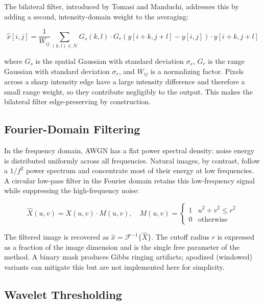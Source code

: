 \documentclass[conference]{IEEEtran}
\begin{document}
The bilateral filter, introduced by Tomasi and Manduchi, addresses this by adding a second, intensity-domain weight to the averaging:

\begin{equation}
  \hat{x}[i,j] = \frac{1}{W_{ij}} \sum_{(k,l) \in \mathcal{N}}
    G_s(k,l) \cdot G_r\!\left(y[i+k,j+l] - y[i,j]\right) \cdot y[i+k,j+l]
  \label{eq:bilateral}
\end{equation}

where $G_s$ is the spatial Gaussian with standard deviation $\sigma_s$, $G_r$ is the range Gaussian with standard deviation $\sigma_r$, and $W_{ij}$ is a normalizing factor. Pixels across a sharp intensity edge have a large intensity difference and therefore a small range weight, so they contribute negligibly to the output. This makes the bilateral filter edge-preserving by construction.

\subsection{Fourier-Domain Filtering}

In the frequency domain, AWGN has a flat power spectral density: noise energy is distributed uniformly across all frequencies. Natural images, by contrast, follow a $1/f^2$ power spectrum and concentrate most of their energy at low frequencies. A circular low-pass filter in the Fourier domain retains this low-frequency signal while suppressing the high-frequency noise:

\begin{equation}
  \hat{X}(u,v) = X(u,v) \cdot M(u,v), \quad
  M(u,v) = \begin{cases} 1 & u^2 + v^2 \leq r^2 \\ 0 & \text{otherwise} \end{cases}
  \label{eq:fourier_lpf}
\end{equation}

The filtered image is recovered as $\hat{x} = \mathcal{F}^{-1}\{\hat{X}\}$. The cutoff radius $r$ is expressed as a fraction of the image dimension and is the single free parameter of the method. A binary mask produces Gibbs ringing artifacts; apodized (windowed) variants can mitigate this but are not implemented here for simplicity.

\subsection{Wavelet Thresholding}
\end{document}
